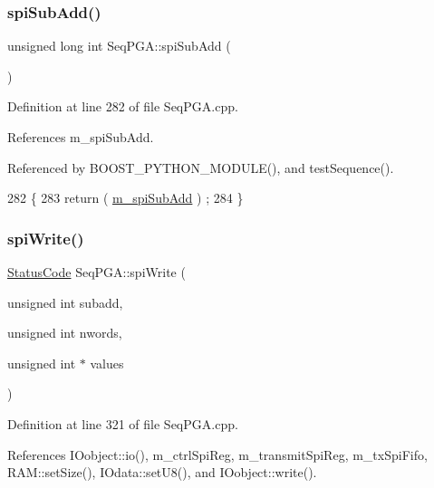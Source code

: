 \subsubsection{\texorpdfstring{spi\+Sub\+Add()}{spiSubAdd()}}
{\footnotesize\ttfamily unsigned long int Seq\+P\+G\+A\+::spi\+Sub\+Add (\begin{DoxyParamCaption}{ }\end{DoxyParamCaption})}



Definition at line 282 of file Seq\+P\+G\+A.\+cpp.



References m\+\_\+spi\+Sub\+Add.



Referenced by B\+O\+O\+S\+T\+\_\+\+P\+Y\+T\+H\+O\+N\+\_\+\+M\+O\+D\+U\+L\+E(), and test\+Sequence().


\begin{DoxyCode}
282                                    \{
283   \textcolor{keywordflow}{return} ( \hyperlink{classSeqPGA_afd5442d9b92f9b59bd553df9bd91dd87}{m\_spiSubAdd} ) ;
284 \}
\end{DoxyCode}
\mbox{\label{classSeqPGA_ad4421841ce4ce8b88ad13f63216f0743}} 
\subsubsection{\texorpdfstring{spi\+Write()}{spiWrite()}\hspace{0.1cm}{\footnotesize\ttfamily [1/3]}}
{\footnotesize\ttfamily \hyperlink{classStatusCode}{Status\+Code} Seq\+P\+G\+A\+::spi\+Write (\begin{DoxyParamCaption}\item[{unsigned int}]{subadd,  }\item[{unsigned int}]{nwords,  }\item[{unsigned int $\ast$}]{values }\end{DoxyParamCaption})}



Definition at line 321 of file Seq\+P\+G\+A.\+cpp.



References I\+Oobject\+::io(), m\+\_\+ctrl\+Spi\+Reg, m\+\_\+transmit\+Spi\+Reg, m\+\_\+tx\+Spi\+Fifo, R\+A\+M\+::set\+Size(), I\+Odata\+::set\+U8(), and I\+Oobject\+::write().



